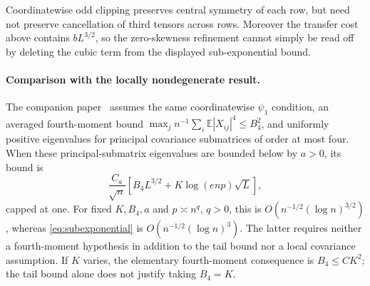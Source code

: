 \documentclass[11pt,letterpaper]{article}
\theoremstyle{remark}
\newcommand{\E}{\mathbb E}
\begin{document}
Coordinatewise odd clipping preserves central symmetry of each row,
but need not preserve cancellation of third tensors across rows.
Moreover the transfer cost above contains \(bL^{3/2}\), so the
zero-skewness refinement cannot simply be read off by deleting the
cubic term from the displayed sub-exponential bound.

\paragraph{Comparison with the locally nondegenerate result.}
The companion paper~\cite[Corollary~1]{Local} assumes the same
coordinatewise \(\psi_1\) condition, an averaged fourth-moment bound
\(\max_jn^{-1}\sum_i\E|X_{ij}|^4\le B_4^2\), and uniformly positive
eigenvalues for principal covariance submatrices of order at most four.
When these principal-submatrix eigenvalues are bounded below by \(a>0\), its bound is
\[
 \frac{C_a}{\sqrt n}\left[B_4L^{3/2}
                   +K\log(enp)\sqrt L\right],
\]
capped at one. For fixed \(K,B_4,a\) and \(p\asymp n^q\), \(q>0\),
this is \(O(n^{-1/2}(\log n)^{3/2})\), whereas
\eqref{eq:subexponential} is \(O(n^{-1/2}(\log n)^3)\).
The latter requires neither a fourth-moment hypothesis in addition to
the tail bound nor a local covariance assumption. If \(K\) varies,
the elementary fourth-moment consequence is \(B_4\le C K^2\);
the tail bound alone does not justify taking \(B_4=K\).
\end{document}
